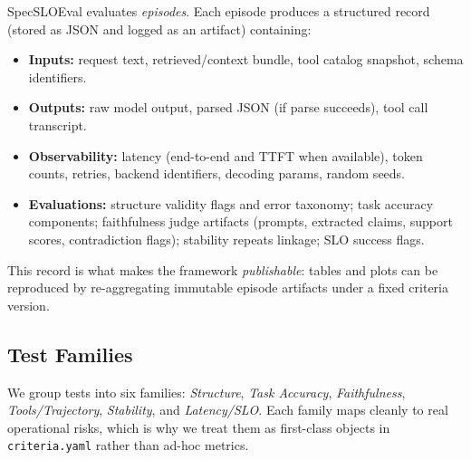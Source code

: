\documentclass[11pt]{article}
\begin{document}
SpecSLOEval evaluates \emph{episodes}. Each episode produces a structured record (stored as JSON and logged as an artifact) containing:

\begin{itemize}[leftmargin=12pt]
    \item \textbf{Inputs:} request text, retrieved/context bundle, tool catalog snapshot, schema identifiers.
    \item \textbf{Outputs:} raw model output, parsed JSON (if parse succeeds), tool call transcript.
    \item \textbf{Observability:} latency (end-to-end and TTFT when available), token counts, retries, backend identifiers, decoding params, random seeds.
    \item \textbf{Evaluations:} structure validity flags and error taxonomy; task accuracy components; faithfulness judge artifacts (prompts, extracted claims, support scores, contradiction flags); stability repeats linkage; SLO success flags.
\end{itemize}

This record is what makes the framework \emph{publishable}: tables and plots can be reproduced by re-aggregating immutable episode artifacts under a fixed criteria version.

\subsection{Test Families}
\label{sec:test-families}

We group tests into six families: \emph{Structure}, \emph{Task Accuracy}, \emph{Faithfulness}, \emph{Tools/Trajectory}, \emph{Stability}, and \emph{Latency/SLO}.
Each family maps cleanly to real operational risks, which is why we treat them as first-class objects in \texttt{criteria.yaml} rather than ad-hoc metrics.
\end{document}
